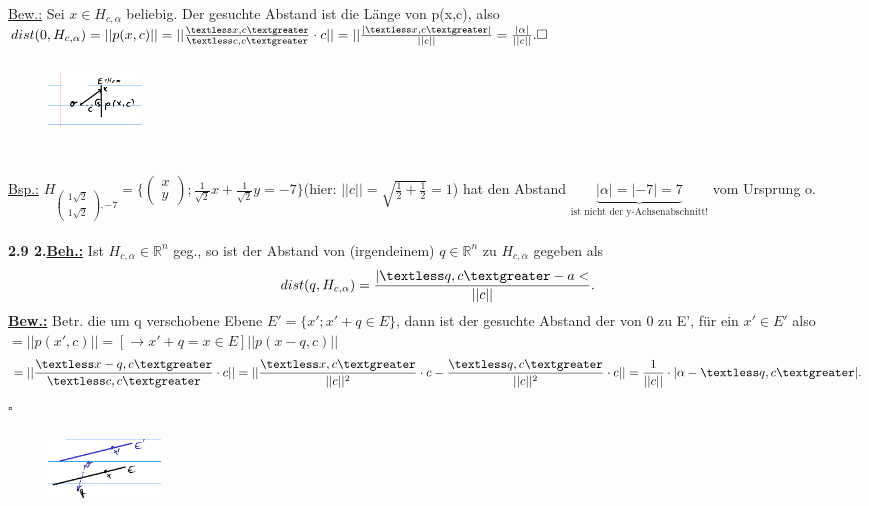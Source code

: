 \documentclass[]{scrartcl}
\begin{document}
 \underline{Bew.:} Sei $x\in H_{c,\alpha}$ beliebig.
 Der gesuchte Abstand ist die Länge von p(x,c), also $dist(0, H_{c,\alpha})=||p(x,c)||=||\frac{\textless x,c\textgreater}{\textless c,c\textgreater}\cdot c||=||\frac{|\textless x,c\textgreater|}{||c||}=\frac{|\alpha|}{||c||}. \square$
 \begin{figure}[h]
 	\includegraphics[width=2.5cm,height=2cm]{Beispiel 2.8}
 \end{figure}\\
\underline{Bsp.:} 
$H_{\begin{pmatrix}
	1\sqrt{2}\\
	1\sqrt{2}
\end{pmatrix},-7}=\{\begin{pmatrix}
	x\\y
\end{pmatrix}; \frac{1}{\sqrt{2}}x+\frac{1}{\sqrt{2}}y=-7\}$(hier: 
$||c||=\sqrt{\frac{1}{2}+\frac{1}{2}}=1$) hat den Abstand $\underbrace{|\alpha| = |-7|=7}_{\text{ist nicht der y-Achsenabschnitt!}}$ 
vom Ursprung o.\\
\\
\textbf{2.9 2.\underline{Beh.:}} Ist $H_{c,\alpha}\in \mathbb{R}^n$ geg., so ist 
der 
Abstand von (irgendeinem) $ q \in \mathbb{R}^n$ zu $H_{c,\alpha}$ gegeben als\\
\begin{equation}
	dist(q,H_{c,\alpha})= \frac{|\textless q,c\textgreater-a <}{||c||}.
\end{equation}
\textbf{\underline{Bew.:}} Betr. die um q verschobene Ebene $E'= \{x'; x'+q\in 
E\}$, dann ist der gesuchte Abstand der von 0 zu E', für ein $x'\in E'$ also 
$=||p(x',c)|| = [\rightarrow x'+q=x\in E] ||p(x-q,c)||$\\
\begin{equation}
	=||\frac{\textless x-q,c\textgreater}{\textless c,c \textgreater}\cdot c||=
	||\frac{\textless x,c \textgreater}{||c||^2}\cdot c -\frac{\textless q,c 
	\textgreater}{||c||^2}\cdot c||=
	\frac{1}{||c||}\cdot|\alpha - \textless q,c \textgreater|.
\end{equation}
\hfill$\square$\\
\begin{figure}[h]  
	\includegraphics[width=3cm,height=2cm]{bild 2.9}
\end{figure}\\
\end{document}
